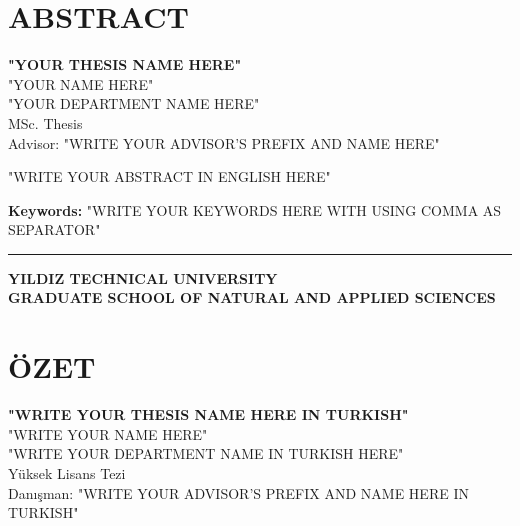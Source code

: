 \documentclass[12pt]{report}
\begin{document}
\chapter*{ABSTRACT}
\vspace{-30pt}
\begin{center}
\uppercase{\large{\bfseries{"YOUR THESIS NAME HERE"}}}\\[1cm]

"YOUR NAME HERE"\\[1cm]

"YOUR DEPARTMENT NAME HERE"\\
MSc. Thesis\\[1cm] %

Advisor: "WRITE YOUR ADVISOR'S PREFIX AND NAME HERE"\\[1cm]
\end{center}

\begin{singlespacing}
"WRITE YOUR ABSTRACT IN ENGLISH HERE"

\vspace{3cm}
\textbf{Keywords:} "WRITE YOUR KEYWORDS HERE WITH USING COMMA AS SEPARATOR"
\end{singlespacing}

\vspace{1ex}
\hrule
\begin{flushright}
\textbf{YILDIZ TECHNICAL UNIVERSITY \\ GRADUATE SCHOOL OF NATURAL AND APPLIED SCIENCES}
\end{flushright}

\chapter*{\"{O}ZET}
\vspace{-30pt}
\begin{center}
\uppercase{\large{\bfseries{"WRITE YOUR THESIS NAME HERE IN TURKISH"}}}\\[1cm]

"WRITE YOUR NAME HERE"\\[1cm]

"WRITE YOUR DEPARTMENT NAME IN TURKISH HERE"\\
Y\"{u}ksek Lisans Tezi\\[1cm] %

Dan{\i}\c{s}man: "WRITE YOUR ADVISOR'S PREFIX AND NAME HERE IN TURKISH"\\[1cm]
\end{center}
\end{document}
